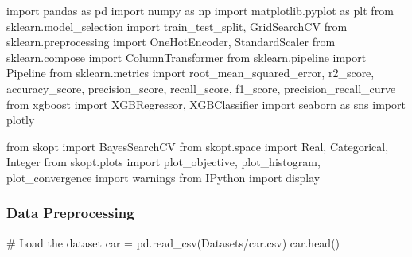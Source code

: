 \documentclass[
  letterpaper,
  DIV=11,
  numbers=noendperiod]{scrreprt}
\newenvironment{Shaded}{\begin{snugshade}}{\end{snugshade}}
\newcommand{\CommentTok}[1]{\textcolor[rgb]{0.37,0.37,0.37}{#1}}
\newcommand{\ImportTok}[1]{\textcolor[rgb]{0.00,0.46,0.62}{#1}}
\newcommand{\NormalTok}[1]{\textcolor[rgb]{0.00,0.23,0.31}{#1}}
\newcommand{\OperatorTok}[1]{\textcolor[rgb]{0.37,0.37,0.37}{#1}}
\newcommand{\StringTok}[1]{\textcolor[rgb]{0.13,0.47,0.30}{#1}}
\begin{document}
\begin{Shaded}
\begin{Highlighting}[]
\ImportTok{import}\NormalTok{ pandas }\ImportTok{as}\NormalTok{ pd}
\ImportTok{import}\NormalTok{ numpy }\ImportTok{as}\NormalTok{ np}
\ImportTok{import}\NormalTok{ matplotlib.pyplot }\ImportTok{as}\NormalTok{ plt}
\ImportTok{from}\NormalTok{ sklearn.model\_selection }\ImportTok{import}\NormalTok{ train\_test\_split, GridSearchCV}
\ImportTok{from}\NormalTok{ sklearn.preprocessing }\ImportTok{import}\NormalTok{ OneHotEncoder, StandardScaler}
\ImportTok{from}\NormalTok{ sklearn.compose }\ImportTok{import}\NormalTok{ ColumnTransformer}
\ImportTok{from}\NormalTok{ sklearn.pipeline }\ImportTok{import}\NormalTok{ Pipeline}
\ImportTok{from}\NormalTok{ sklearn.metrics }\ImportTok{import}\NormalTok{ root\_mean\_squared\_error, r2\_score, accuracy\_score, precision\_score, recall\_score, f1\_score, precision\_recall\_curve}
\ImportTok{from}\NormalTok{ xgboost }\ImportTok{import}\NormalTok{ XGBRegressor, XGBClassifier}
\ImportTok{import}\NormalTok{ seaborn }\ImportTok{as}\NormalTok{ sns}
\ImportTok{import}\NormalTok{ plotly}

\ImportTok{from}\NormalTok{ skopt }\ImportTok{import}\NormalTok{ BayesSearchCV}
\ImportTok{from}\NormalTok{ skopt.space }\ImportTok{import}\NormalTok{ Real, Categorical, Integer}
\ImportTok{from}\NormalTok{ skopt.plots }\ImportTok{import}\NormalTok{ plot\_objective, plot\_histogram, plot\_convergence}
\ImportTok{import}\NormalTok{ warnings}
\ImportTok{from}\NormalTok{ IPython }\ImportTok{import}\NormalTok{ display}
\end{Highlighting}
\end{Shaded}

\subsubsection{Data Preprocessing}\label{data-preprocessing}

\begin{Shaded}
\begin{Highlighting}[]
\CommentTok{\# Load the dataset}
\NormalTok{car }\OperatorTok{=}\NormalTok{ pd.read\_csv(}\StringTok{\textquotesingle{}Datasets/car.csv\textquotesingle{}}\NormalTok{)}
\NormalTok{car.head()}
\end{Highlighting}
\end{Shaded}
\end{document}
